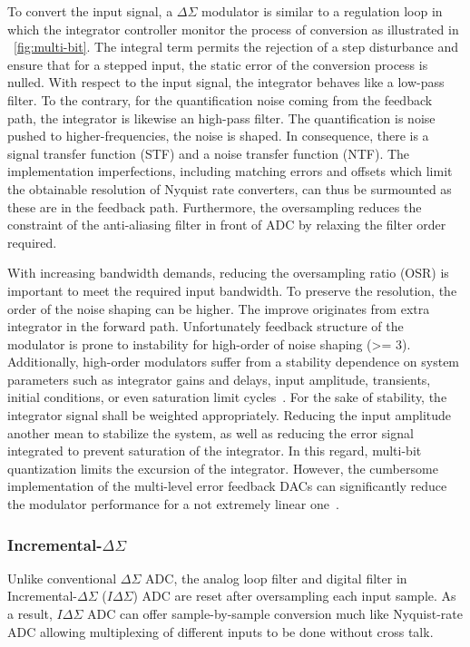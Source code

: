 To convert the input signal, a $\Delta\Sigma$ modulator is similar to a regulation loop in which the integrator controller monitor the process of conversion as illustrated in \figurename~\ref{fig:multi-bit}. The integral term permits the rejection of a step disturbance and ensure that for a stepped input, the static error of the conversion process is nulled. With respect to the input signal, the integrator behaves like a low-pass filter. To the contrary, for the quantification noise coming from the feedback path, the integrator is likewise an high-pass filter. The quantification is noise pushed to higher-frequencies, the noise is shaped. In consequence, there is a signal transfer function (STF) and a noise transfer function (NTF). The implementation imperfections, including matching errors and offsets which limit the obtainable resolution of Nyquist rate converters, can thus be surmounted as these are in the feedback path. Furthermore, the oversampling reduces the constraint of the anti-aliasing filter in front of ADC by relaxing the filter order required.

With increasing bandwidth demands, reducing the oversampling ratio (OSR) is important to meet the required input bandwidth. To preserve the resolution, the order of the noise shaping can be higher. The improve originates from extra integrator in the forward path. Unfortunately feedback structure of the modulator is prone to instability for high-order of noise shaping (>= 3). Additionally, high-order modulators suffer from a stability dependence on system parameters such as integrator gains and delays, input amplitude, transients, initial conditions, or even saturation limit cycles~\cite{Hein1993,Baird1994,Steven1996}. For the sake of stability, the integrator signal shall be weighted appropriately. Reducing the input amplitude another mean to stabilize the system, as well as reducing the error signal integrated to prevent saturation of the integrator. In this regard, multi-bit quantization limits the excursion of the integrator. However, the cumbersome implementation of the multi-level error feedback DACs can significantly reduce the modulator performance for a not extremely linear one~\cite{Medeiro1999}.

\subsubsection{Incremental-\(\Delta\Sigma \)}
\label{sec:soa-isd}
Unlike conventional \(\Delta\Sigma \) ADC, the analog loop filter and digital filter in Incremental-\(\Delta\Sigma \) (\(I\Delta\Sigma \)) ADC are reset after oversampling each input sample. As a result, \(I\Delta\Sigma \) ADC can offer sample-by-sample conversion much like Nyquist-rate ADC allowing multiplexing of different inputs to be done without cross talk.

